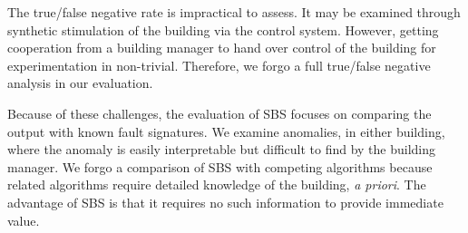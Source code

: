 The true/false negative rate is impractical to assess.  It may be examined through synthetic stimulation of
the building via the control system.  However, getting cooperation from a building manager to hand over control of the building
for experimentation in non-trivial.  Therefore, we forgo a full true/false negative analysis in our evaluation.

Because of these challenges, the evaluation of SBS focuses on comparing the output with known fault
signatures.  We examine anomalies, in either building, where the anomaly is easily interpretable but
difficult to find by the building manager.  We forgo a comparison of SBS with competing algorithms because
 related algorithms require detailed knowledge of the building, \emph{a priori}.  The advantage of SBS is that it 
requires no such information to provide immediate value.